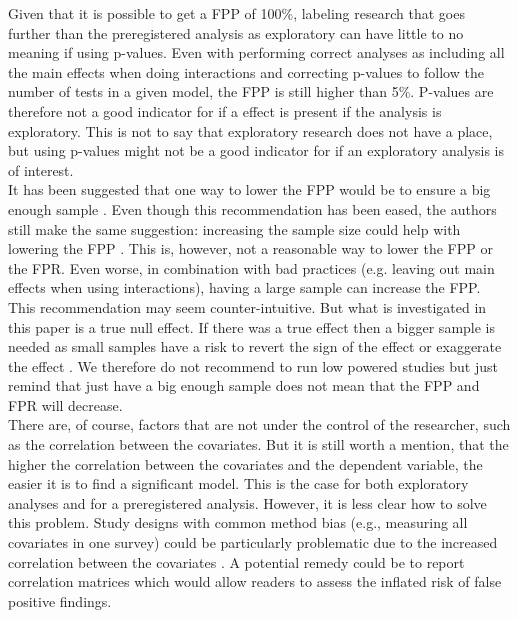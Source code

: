 Given that it is possible to get a FPP of 100\%, labeling research that goes further than the preregistered analysis as exploratory can have little to no meaning if using p-values. Even with performing correct analyses as including all the main effects when doing interactions and correcting p-values to follow the number of tests in a given model, the FPP is still higher than 5\%. P-values are therefore not a good indicator for if a effect is present if the analysis is exploratory. This is not to say that exploratory research does not have a place, but using p-values might not be a good indicator for if an exploratory analysis is of interest. \\
    
It has been suggested that one way to lower the FPP would be to ensure a big enough sample \citep{Simmons2011}. Even though this recommendation has been eased, the authors still make the same suggestion: increasing the sample size could help with lowering the FPP \cite{simmons2018}. This is, however, not a reasonable way to lower the FPP or the FPR. Even worse, in combination with bad practices (e.g. leaving out main effects when using interactions), having a large sample can increase the FPP. This recommendation may seem counter-intuitive. But what is investigated in this paper is a true null effect. If there was a true effect then a bigger sample is needed as small samples have a risk to revert the sign of the effect or exaggerate the effect \citep{gelman2014beyond}. We therefore do not recommend to run low powered studies but just remind that just have a big enough sample does not mean that the FPP and FPR will decrease.\\

There are, of course, factors that are not under the control of the researcher, such as the correlation between the covariates. But it is still worth a mention, that the higher the correlation between the covariates and the dependent variable, the easier it is to find a significant model. This is the case for both exploratory analyses and for a preregistered analysis. However, it is less clear how to solve this problem. Study designs with common method bias (e.g., measuring all covariates in one survey) could be particularly problematic due to  the increased correlation between the covariates \citep{podsakoff2003}. A potential remedy could be to report correlation matrices which would allow readers to assess the inflated risk of false positive findings.  \\ 

